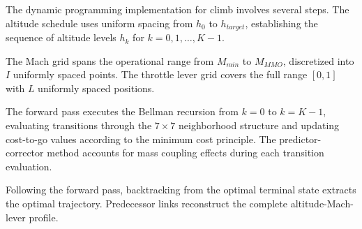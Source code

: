 The dynamic programming implementation for climb involves several steps. The altitude schedule uses uniform spacing from $h_0$ to $h_{target}$, establishing the sequence of altitude levels $h_k$ for $k = 0, 1, \ldots, K-1$.

The Mach grid spans the operational range from $M_{min}$ to $M_{MMO}$, discretized into $I$ uniformly spaced points. The throttle lever grid covers the full range $[0, 1]$ with $L$ uniformly spaced positions.

The forward pass executes the Bellman recursion from $k = 0$ to $k = K-1$, evaluating transitions through the $7 \times 7$ neighborhood structure and updating cost-to-go values according to the minimum cost principle. The predictor-corrector method accounts for mass coupling effects during each transition evaluation.

Following the forward pass, backtracking from the optimal terminal state extracts the optimal trajectory. Predecessor links reconstruct the complete altitude-Mach-lever profile.
